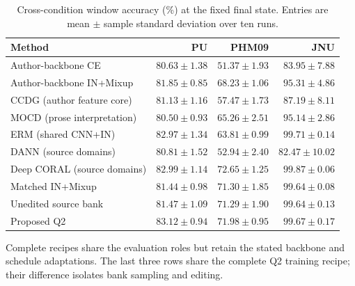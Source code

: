 \begin{table}[pos=htbp]
\centering\small
\caption{Cross-condition window accuracy (\%) at the fixed final state. Entries are mean $\pm$ sample standard deviation over ten runs.}
\label{tab:main}
\begin{tabular}{lrrr}
\toprule
Method & PU & PHM09 & JNU\\
\midrule
Author-backbone CE & $80.63\pm1.38$ & $51.37\pm1.93$ & $83.95\pm7.88$\\
Author-backbone IN+Mixup & $81.85\pm0.85$ & $68.23\pm1.06$ & $95.31\pm4.86$\\
CCDG (author feature core) & $81.13\pm1.16$ & $57.47\pm1.73$ & $87.19\pm8.11$\\
MOCD (prose interpretation) & $80.50\pm0.93$ & $65.26\pm2.51$ & $95.14\pm2.86$\\
ERM (shared CNN+IN) & $82.97\pm1.34$ & $63.81\pm0.99$ & $99.71\pm0.14$\\
DANN (source domains) & $80.81\pm1.52$ & $52.94\pm2.40$ & $82.47\pm10.02$\\
Deep CORAL (source domains) & $82.99\pm1.14$ & $72.65\pm1.25$ & $99.87\pm0.06$\\
Matched IN+Mixup & $81.44\pm0.98$ & $71.30\pm1.85$ & $99.64\pm0.08$\\
Unedited source bank & $81.47\pm1.09$ & $71.29\pm1.90$ & $99.64\pm0.13$\\
Proposed Q2 & $83.12\pm0.94$ & $71.98\pm0.95$ & $99.67\pm0.17$\\
\bottomrule
\end{tabular}
\par\medskip\begin{minipage}{.98\linewidth}\footnotesize Complete recipes share the evaluation roles but retain the stated backbone and schedule adaptations. The last three rows share the complete Q2 training recipe; their difference isolates bank sampling and editing.\end{minipage}
\end{table}

